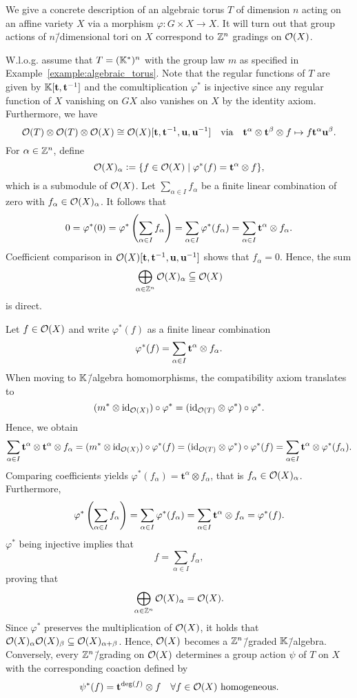 \begin{construction}
	\label{construction:algebraic_torus}
	We give a concrete description of an algebraic torus $T$ of dimension $n$ acting on an affine variety $X$ via a morphism $\varphi\colon G\times X \rightarrow X$. It will turn out that group actions of $n$\=/dimensional tori on $X$ correspond to $\mathbb{Z}^n$ gradings on $\mathcal{O}(X)$.
	
	W.l.o.g. assume that $T = (\mathbb{K}^*)^n$ with the group law $m$ as specified in Example~\ref{example:algebraic_torus}. Note that the regular functions of $T$ are given by $\mathbb{K}[\mathbf{t},\mathbf{t}^{-1}]$ and the comultiplication $\varphi^*$ is injective since any regular function of $X$ vanishing on $GX$ also vanishes on $X$ by the identity axiom. Furthermore, we have $$\mathcal{O}(T)\otimes\mathcal{O}(T)\otimes\mathcal{O}(X)\cong\mathcal{O}(X)[\mathbf{t},\mathbf{t}^{-1},\mathbf{u},\mathbf{u}^{-1}]\quad\text{via}\quad\mathbf{t}^\alpha \otimes \mathbf{t}^\beta \otimes f \mapsto f\mathbf{t}^\alpha\mathbf{u}^\beta.$$
	For $\alpha\in\mathbb{Z}^n$, define
	$$\mathcal{O}(X)_\alpha \mathrel{\mathop:}= \{f\in\mathcal{O}(X)\mid \varphi^*(f) = \mathbf{t}^\alpha \otimes f\},$$
	which is a submodule of $\mathcal{O}(X)$. Let $\sum_{\alpha\in I} f_\alpha$ be a finite linear combination of zero with $f_\alpha\in\mathcal{O}(X)_\alpha$. It follows that
	$$0 = \varphi^*(0) = \varphi^*\left(\sum_{\alpha\in I} f_\alpha\right) = \sum_{\alpha\in I} \varphi^*(f_\alpha) = \sum_{\alpha\in I} \mathbf{t}^\alpha \otimes f_\alpha.$$
	Coefficient comparison in $\mathcal{O}(X)[\mathbf{t},\mathbf{t}^{-1},\mathbf{u},\mathbf{u}^{-1}]$ shows that $f_\alpha = 0$. Hence, the sum
	$$\bigoplus_{\alpha\in\mathbb{Z}^n} \mathcal{O}(X)_\alpha \subseteqq \mathcal{O}(X)$$
	is direct.

	Let $f\in \mathcal{O}(X)$ and write $\varphi^*(f)$ as a finite linear combination
	$$\varphi^*(f) = \sum_{\alpha\in I} \mathbf{t}^\alpha \otimes f_\alpha.$$
	When moving to $\mathbb{K}$\=/algebra homomorphisms, the compatibility axiom translates to
	$$(m^* \otimes \text{id}_{\mathcal{O}(X)}) \circ \varphi^* = (\text{id}_{\mathcal{O}(T)} \otimes \varphi^*) \circ \varphi^*.$$
	Hence, we obtain
	$$\sum_{\alpha\in I} \mathbf{t}^\alpha \otimes \mathbf{t}^\alpha \otimes f_\alpha = (m^* \otimes \text{id}_{\mathcal{O}(X)}) \circ \varphi^*(f) =  (\text{id}_{\mathcal{O}(T)} \otimes \varphi^*) \circ \varphi^*(f) = \sum_{\alpha\in I}\mathbf{t}^\alpha \otimes \varphi^*(f_\alpha).$$
	Comparing coefficients yields $\varphi^*(f_\alpha) = \mathbf{t}^\alpha \otimes f_\alpha$, that is $f_\alpha\in \mathcal{O}(X)_\alpha$. Furthermore,
	$$\varphi^*\left(\sum_{\alpha\in I} f_\alpha\right) = \sum_{\alpha\in I} \varphi^*(f_\alpha) = \sum_{\alpha\in I} \mathbf{t}^\alpha \otimes f_\alpha = \varphi^*(f).$$
	$\varphi^*$ being injective implies that
	$$f = \sum_{\alpha\in I} f_\alpha,$$
	proving that
	$$\bigoplus_{\alpha\in\mathbb{Z}^n} \mathcal{O}(X)_\alpha = \mathcal{O}(X).$$
	Since $\varphi^*$ preserves the multiplication of $\mathcal{O}(X)$, it holds that $\mathcal{O}(X)_\alpha \mathcal{O}(X)_\beta \subseteq \mathcal{O}(X)_{\alpha+\beta}$. Hence, $\mathcal{O}(X)$ becomes a $\mathbb{Z}^n$\=/graded $\mathbb{K}$\=/algebra. Conversely, every $\mathbb{Z}^n$\=/grading on $\mathcal{O}(X)$ determines a group action $\psi$ of $T$ on $X$ with the corresponding coaction defined by 
	$$\psi^*(f) = \mathbf{t}^{\deg(f)}\otimes f\quad \forall f\in\mathcal{O}(X)\ \mathrm{homogeneous}.$$
	

\end{construction}

